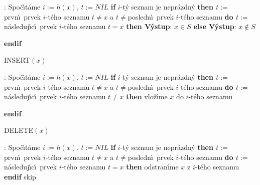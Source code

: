 :\newline 
Spo\v c\'\i t\'ame $i:=h\left(x\right)$, $t:=NIL$\newline 
{\bf if} $i$-t\'y seznam je nepr\'azdn\'y {\bf then\newline 
\phantom{{\rm ---}}$t:=$}prvn\'\i\ prvek $i$-t\'eho seznamu\newline 
\phantom{---}{\bf while} $t\ne x$ a $t\ne$posledn\'\i\ prvek $i$-t\'eho seznamu {\bf do\newline 
\phantom{{\rm ------}}$t:=$}n\'asleduj\'\i c\'\i\ prvek $i$-t\'eho seznamu\newline 
\phantom{---}{\bf enddo\newline 
endif\newline 
if} $t=x$ {\bf then V\'ystup}: $x\in S$ {\bf else V\'ystup}: $x\notin 
S$ {\bf endif
\medskip

\flushpar INSERT$\left(x\right)$}:\newline 
Spo\v c\'\i t\'ame $i:=h\left(x\right)$, $t:=NIL$\newline 
{\bf if} $i$-t\'y seznam je nepr\'azdn\'y {\bf then\newline 
\phantom{{\rm ---}}$t:=$}prvn\'\i\ prvek $i$-t\'eho seznamu\newline 
\phantom{---}{\bf while} $t\ne x$ a $t\ne$posledn\'\i\ prvek $i$-t\'eho seznamu {\bf do\newline 
\phantom{{\rm ------}}$t:=$}n\'asleduj\'\i c\'\i\ prvek $i$-t\'eho seznamu\newline 
\phantom{---}{\bf enddo\newline 
endif\newline 
if} $t\ne x$ {\bf then} vlo\v z\'\i me $x$ do $i$-t\'eho seznamu {\bf endif
\medskip

\flushpar DELETE$\left(x\right)$}:\newline 
Spo\v c\'\i t\'ame $i:=h\left(x\right)$, $t:=NIL$\newline 
{\bf if} $i$-t\'y seznam je nepr\'azdn\'y {\bf then\newline 
\phantom{{\rm ---}}$t:=$}prvn\'\i\ prvek $i$-t\'eho seznamu\newline 
\phantom{---}{\bf while} $t\ne x$ a $t\ne$posledn\'\i\ prvek $i$-t\'eho seznamu {\bf do\newline 
\phantom{{\rm ------}}$t:=$}n\'asleduj\'\i c\'\i\ prvek $i$-t\'eho seznamu\newline 
\phantom{---}{\bf enddo\newline 
endif\newline 
if} $t=x$ {\bf then} odstran\'\i me $x$ z $i$-t\'eho seznamu {\bf endif}
skip

